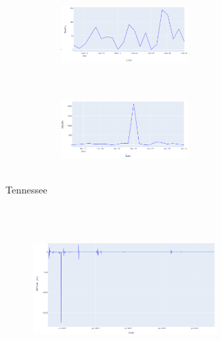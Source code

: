 \documentclass[11pt,twocolumn,letterpaper]{article}
\begin{document}
\begin{figure}
\begin{subfigure}{0.48\linewidth}
\begin{subfigure}{0.48\linewidth}
    \end{subfigure}
    \hfill
    \begin{subfigure}{0.48\linewidth}
        \begin{subfigure}{\linewidth}
            \centering
            \includegraphics[width=\linewidth, height=3.15cm]{images/tn_cdc.PNG}
            \vfill
        \end{subfigure}
        \begin{subfigure}{\linewidth}
            \centering
            \includegraphics[width=\linewidth, height=3.15cm]{images/tn_jhu.PNG}
            \vfill
        \end{subfigure}
    \end{subfigure}
    \caption{Tennessee}
\end{subfigure}
\hfill
\begin{subfigure}{0.48\linewidth}
    \begin{subfigure}{0.48\linewidth}
        \centering
        \includegraphics[width=\linewidth, height=6.3cm]{images/nj_overview.PNG}
    \end{subfigure}
    \hfill
    \begin{subfigure}{0.48\linewidth}
        \begin{subfigure}{\linewidth}

\end{subfigure}
\end{subfigure}
\end{subfigure}
\end{figure}
\end{document}
